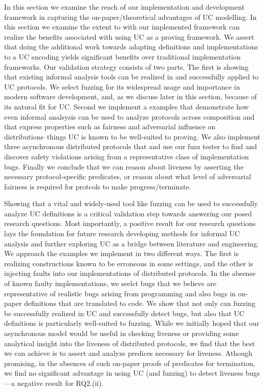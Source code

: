 In this section we examine the reach of our implementation and development framework in capturing the on-paper/theoretical advantages of UC modelling. 
In this section we examine the extent to with our implemented framework can realize the benefits associated with using UC as a proving framework.
We assert that doing the additional work towards adapting definitions and implementations to a UC encoding yields significant benefits over traditional implementation frameworks.
Our validation strategy consists of two parts.
The first is showing that existing informal analysis tools can be realized in and successfully applied to UC protocols.
We select fuzzing for its widespread usage and importance in modern software development, and, as we discuss later in this section, because of its natural fit for UC.
Second we implement a examples that demonstrate how even informal analsysis can be used to analyze protocols across composition and that express properties such as fairness and adversarial influence on distributions--things UC is known to be well-suited to proving.
We also implement three asynchronous distributed protocols that and use our fuzz tester to find and discover safety violations arising from a representative class of implementation bugs.
Finally we conclude that we can reason about liveness by asserting the necessary protocol-specific predicates, or reason about what level of adversarial fairness is required for protcols to make progress/terminate. 

Showing that a vital and widely-used tool like fuzzing can be used to successfully analyze UC definitions is a critical validation step towards answering our posed research questions. 
Most importantly, a positive result for our research questions lays the foundation for future research developing methods for informal UC analysis and further exploring UC as a bridge between literature and engineering.
We approach the examples we implement in two different ways.
The first is realizing constructions known to be erroneous in some settings, and the other is injecting faults into our implementations of distributed protocols.
In the absense of known faulty implementations, we seelct bugs that we believe are representative of realistic bugs arising from programming and also bugs in on-paper definitions that are translated to code.
We show that not only can fuzzing be successfully realized in UC and successfully detect bugs, but also that UC definitions is particularly well-suited to fuzzing. 
While we initially hoped that our asynchronous model would be useful in checking liveness or providing some analytical insight into the liveness of distributed protocols, we find that the best we can achieve is to assert and analyze predices necessary for liveness.
Athough promising, in the absences of such on-paper proofs of predicates for termination, we find no significant advantage in using UC (and fuzzing) to detect liveness bugs---a negative result for RQ2.(ii).

